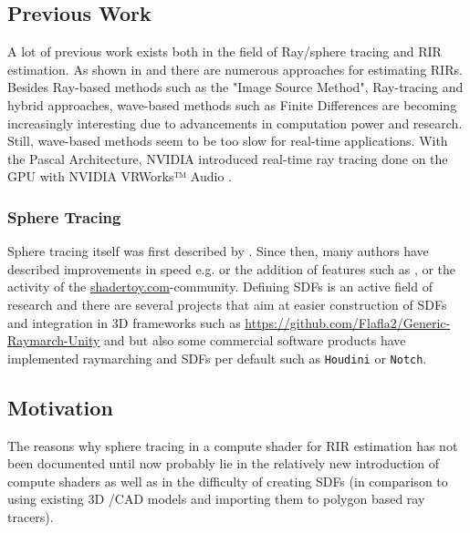 \documentclass[twoside,a4paper]{article}
\begin{document}
\subsection{Previous Work}
\label{ssec:prev}
A lot of previous work exists both in the field of Ray/sphere tracing and RIR estimation.
As shown in \cite{alpkocak_computing_2010} and \cite{brinkmann_round_2019} there are numerous approaches for estimating RIRs. Besides Ray-based methods such as the "Image Source Method", Ray-tracing and hybrid approaches, wave-based methods such as Finite Differences are becoming increasingly interesting due to advancements in computation power and research. Still, wave-based methods seem to be too slow for real-time applications. With the Pascal Architecture, NVIDIA introduced real-time ray tracing done on the GPU with NVIDIA VRWorks™ Audio \cite{noauthor_vrworks_nodate}.






\subsubsection*{Sphere Tracing}
Sphere tracing itself was first described by \cite{hart_sphere_1996}. Since then, many authors have described improvements in speed e.g. \cite{balint_accelerating_2018} or the addition of features such as \cite{quilez_inigo_nodate}, \cite{keinert_enhanced_2014} or the activity of the \href{www.shadertoy.com}{shadertoy.com}-community.
Defining SDFs is an active field of research and there are several projects that aim at easier construction of SDFs and integration in 3D frameworks such as \href{https://github.com/Flafla2/Generic-Raymarch-Unity}{https://github.com/Flafla2/Generic-Raymarch-Unity} and \cite{lechner_hrtlacektdraymarchtoolkit_2020} but also some commercial software products have implemented raymarching and SDFs per default such as \texttt{Houdini} or \texttt{Notch}.



\subsection{Motivation}
\label{subs:mot}
The reasons why sphere tracing in a compute shader for RIR estimation has not been documented until now probably lie in the relatively new introduction of compute shaders as well as in the difficulty of creating SDFs (in comparison to using existing 3D /CAD models and importing them to polygon based ray tracers).
\end{document}
